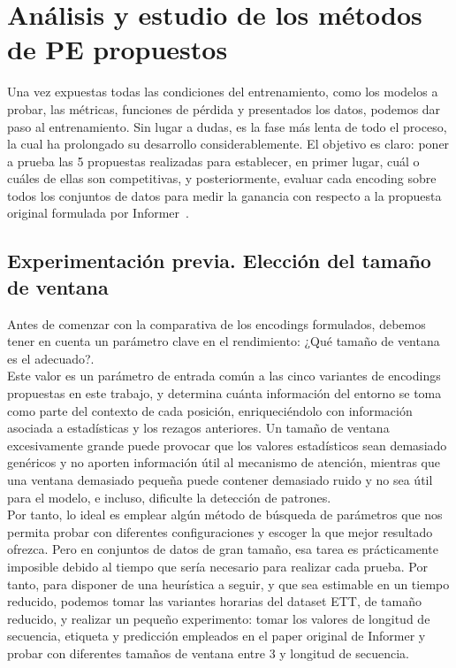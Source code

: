 \chapter{Análisis y estudio de los métodos de PE propuestos}

Una vez expuestas todas las condiciones del entrenamiento, como los modelos a probar, las métricas, funciones de pérdida y presentados los datos, podemos dar paso al entrenamiento. Sin lugar a dudas, es la fase más lenta de todo el proceso, la cual ha prolongado su desarrollo considerablemente. El objetivo es claro: poner a prueba las 5 propuestas realizadas para establecer, en primer lugar, cuál o cuáles de ellas son competitivas, y posteriormente, evaluar cada encoding sobre todos los conjuntos de datos para medir la ganancia con respecto a la propuesta original formulada por Informer~\cite{zhou2021informerefficienttransformerlong}.


\section{Experimentación previa. Elección del tamaño de ventana}

Antes de comenzar con la comparativa de los encodings formulados, debemos tener en cuenta un parámetro clave en el rendimiento: ¿Qué tamaño de ventana es el adecuado?.\\

Este valor es un parámetro de entrada común a las cinco variantes de encodings propuestas en este trabajo, y determina cuánta información del entorno se toma como parte del contexto de cada posición, enriqueciéndolo con información asociada a estadísticas y los rezagos anteriores. Un tamaño de ventana excesivamente grande puede provocar que los valores estadísticos sean demasiado genéricos y no aporten información útil al mecanismo de atención, mientras que una ventana demasiado pequeña puede contener demasiado ruido y no sea útil para el modelo, e incluso, dificulte la detección de patrones.\\

Por tanto, lo ideal es emplear algún método de búsqueda de parámetros que nos permita probar con diferentes configuraciones y escoger la que mejor resultado ofrezca. Pero en conjuntos de datos de gran tamaño, esa tarea es prácticamente imposible debido al tiempo que sería necesario para realizar cada prueba. Por tanto, para disponer de una heurística a seguir, y que sea estimable en un tiempo reducido, podemos tomar las variantes horarias del dataset ETT, de tamaño reducido, y realizar un pequeño experimento: tomar los valores de longitud de secuencia, etiqueta y predicción empleados en el paper original de Informer y probar con diferentes tamaños de ventana entre 3 y longitud de secuencia.\\

